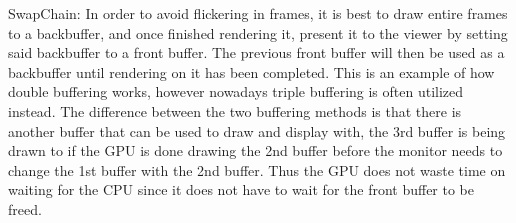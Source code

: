 SwapChain:
In order to avoid flickering in frames, it is best to draw entire frames to a backbuffer, and once finished rendering it, present it to the viewer by setting said backbuffer to a front buffer.
The previous front buffer will then be used as a backbuffer until rendering on it has been completed.
This is an example of how double buffering works, however nowadays triple buffering is often utilized instead.
The difference between the two buffering methods is that there is another buffer that can be used to draw and display with, the 3rd buffer is being drawn to if the \gls{GPU} is done drawing the 2nd buffer before the monitor needs to change the 1st buffer with the 2nd buffer.
Thus the \gls{GPU} does not waste time on waiting for the \gls{CPU} since it does not have to wait for the front buffer to be freed.



